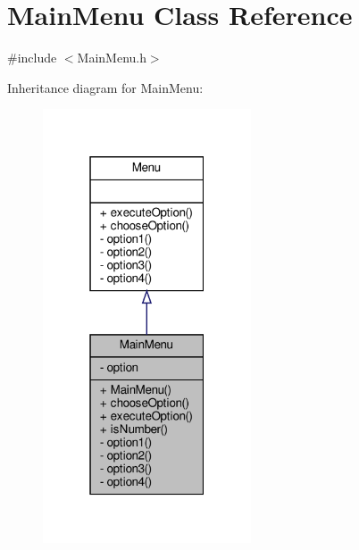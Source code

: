 \hypertarget{classMainMenu}{}\section{Main\+Menu Class Reference}
\label{classMainMenu}


{\ttfamily \#include $<$Main\+Menu.\+h$>$}



Inheritance diagram for Main\+Menu\+:
\nopagebreak
\begin{figure}[H]
\begin{center}
\leavevmode
\includegraphics[width=175pt]{classMainMenu__inherit__graph}
\end{center}
\end{figure}


